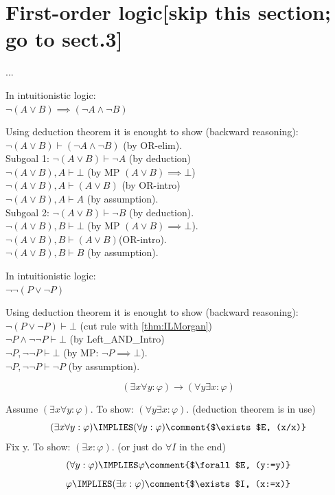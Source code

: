 \section{First-order logic[skip this section; go to sect.3]}
...
\begin{theorem}
\label{thm:ILMorgan}
In intuitionistic logic:\\
$\neg (A\lor B) \implies (\neg A\land\neg B)$
\end{theorem}
\Proof
Using deduction theorem it is enought to show (backward reasoning):\\
$\neg (A\lor B) \vdash (\neg A\land\neg B)$ (by OR-elim).\\
Subgoal 1: $\neg (A\lor B) \vdash \neg A$ (by deduction)\\
$\neg (A\lor B), A \vdash \bot$ (by MP $(A\lor B)\implies\bot$)\\
$\neg (A\lor B), A \vdash (A\lor B)$ (by OR-intro)\\
$\neg (A\lor B), A \vdash A$ (by assumption).\\
Subgoal 2: $\neg (A\lor B) \vdash \neg B$ (by deduction).\\
$\neg (A\lor B), B \vdash \bot$ (by MP $(A\lor B)\implies\bot$).\\
$\neg (A\lor B), B \vdash (A\lor B)$(OR-intro).\\
$\neg (A\lor B), B \vdash B$ (by assumption).\\
\Done

\begin{theorem} In intuitionistic logic:\\
\label{double neg LEM}
$\neg\neg (P\lor\neg P)$
\end{theorem}
\Proof
Using deduction theorem it is enought to show (backward reasoning):\\
$\neg (P\lor\neg P) \vdash \bot$ (cut rule with \ref{thm:ILMorgan})\\
$\neg P\land\neg\neg P \vdash \bot$ (by Left\_AND\_Intro)\\
$\neg P, \neg\neg P \vdash \bot$ (by MP: $\neg P \implies \bot$).\\
$\neg P, \neg\neg P \vdash \neg P$ (by assumption).\\
\Done

\begin{theorem}
\[
(\exists x \forall y:\varphi) \longrightarrow (\forall y \exists x :\varphi)
\]
\end{theorem}
\Proof
Assume $(\exists x \forall y:\varphi)$. To show: $(\forall y \exists x :\varphi)$. (deduction theorem is in use)
\[
(\exists x \forall y:\varphi)
\IMPLIES
(\forall y:\varphi)
\comment{$\exists$E, (x/x)}
\]
Fix y. To show: $(\exists x :\varphi)$. (or just do $\forall I$ in the end)\\
\[
(\forall y:\varphi)
\IMPLIES
\varphi
\comment{$\forall$E, (y:=y)}
\]
\[
\varphi
\IMPLIES
(\exists x :\varphi)
\comment{$\exists$I, (x:=x)}
\]
\Done

